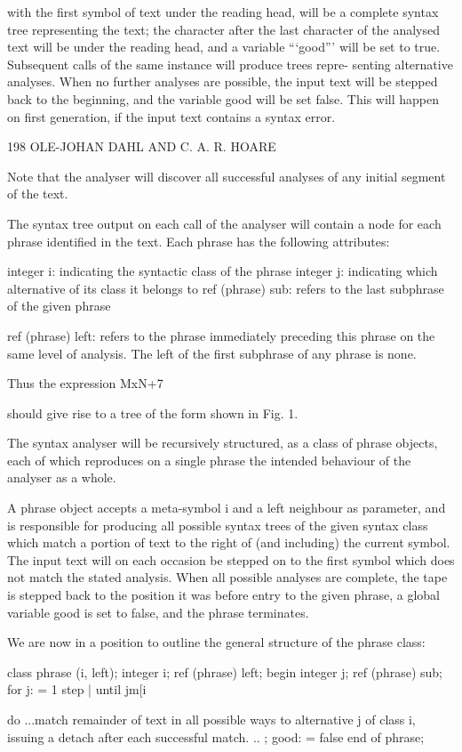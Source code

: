 {{{{{		with the first symbol of text under the reading head, will be a complete syntax tree representing the text; the character after the last character of the analysed text will be under the reading head, and a variable “‘good”’ will be set to true. Subsequent calls of the same instance will produce trees repre- senting alternative analyses. When no further analyses are possible, the input text will be stepped back to the beginning, and the variable good will be set false. This will happen on first generation, if the input text contains a syntax error.
		
		198 OLE-JOHAN DAHL AND C. A. R. HOARE
		
		Note that the analyser will discover all successful analyses of any initial segment of the text.
		
		The syntax tree output on each call of the analyser will contain a node for each phrase identified in the text. Each phrase has the following attributes:
		
		integer i: indicating the syntactic class of the phrase integer j: indicating which alternative of its class it belongs to ref (phrase) sub: refers to the last subphrase of the given phrase
		
		ref (phrase) left: refers to the phrase immediately preceding this phrase on the same level of analysis. The left of the first subphrase of any phrase is none.
		
		Thus the expression MxN+7
		
		should give rise to a tree of the form shown in Fig. 1.
		
		The syntax analyser will be recursively structured, as a class of phrase objects, each of which reproduces on a single phrase the intended behaviour of the analyser as a whole.
		
		A phrase object accepts a meta-symbol i and a left neighbour as parameter, and is responsible for producing all possible syntax trees of the given syntax class which match a portion of text to the right of (and including) the current symbol. The input text will on each occasion be stepped on to the first symbol which does not match the stated analysis. When all possible analyses are complete, the tape is stepped back to the position it was before entry to the given phrase, a global variable good is set to false, and the phrase terminates.
		
		We are now in a position to outline the general structure of the phrase class:
		
		class phrase (i, left); integer i; ref (phrase) left; begin integer j; ref (phrase) sub; for j: = 1 step | until jm[i} do ...match remainder of text in all possible ways to alternative j of class i, issuing a detach after each successful match. .. ; good: = false end of phrase;
	
}}}}
